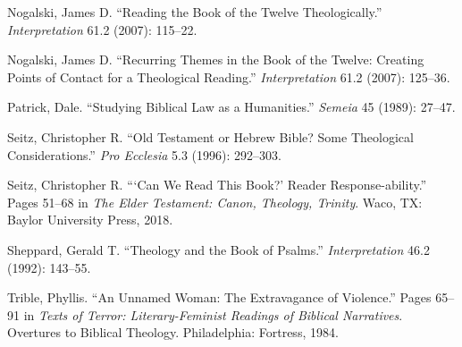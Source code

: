 \documentclass[titlepage]{article}
\begin{document}
\begin{thebibliography}{99}
 Nogalski, James D. “Reading the Book of the Twelve Theologically.” \emph{Interpretation} 61.2 (2007): 115–22.

 Nogalski, James D. “Recurring Themes in the Book of the Twelve: Creating Points of Contact for a Theological Reading.” \emph{Interpretation} 61.2 (2007): 125–36.

 Patrick, Dale. “Studying Biblical Law as a Humanities.” \emph{Semeia} 45 (1989): 27–47.

 Seitz, Christopher R. “Old Testament or Hebrew Bible? Some Theological Considerations.” \emph{Pro Ecclesia} 5.3 (1996): 292–303.

 Seitz, Christopher R. “‘Can We Read This Book?’ Reader Response-ability.” Pages 51–68 in \emph{The Elder Testament: Canon, Theology, Trinity}. Waco, TX: Baylor University Press, 2018.

 Sheppard, Gerald T. “Theology and the Book of Psalms.” \emph{Interpretation} 46.2 (1992): 143–55.

 Trible, Phyllis. “An Unnamed Woman: The Extravagance of Violence.” Pages 65–91 in \emph{Texts of Terror: Literary-Feminist Readings of Biblical Narratives}. Overtures to Biblical Theology. Philadelphia: Fortress, 1984.

\end{thebibliography}
\endgroup
\end{document}
